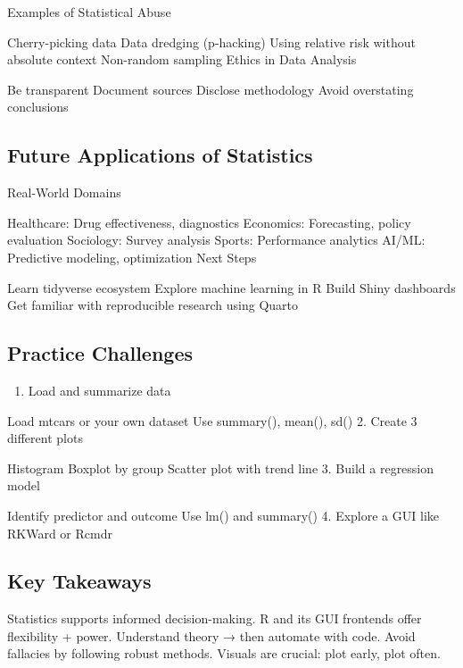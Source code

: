 \documentclass[
  letterpaper,
  DIV=11,
  numbers=noendperiod]{scrreprt}
\providecommand{\tightlist}{%
  \setlength{\itemsep}{0pt}\setlength{\parskip}{0pt}}
\begin{document}
Examples of Statistical Abuse

Cherry-picking data Data dredging (p-hacking) Using relative risk
without absolute context Non-random sampling Ethics in Data Analysis

Be transparent Document sources Disclose methodology Avoid overstating
conclusions

\subsection{Future Applications of
Statistics}\label{future-applications-of-statistics}

Real-World Domains

Healthcare: Drug effectiveness, diagnostics Economics: Forecasting,
policy evaluation Sociology: Survey analysis Sports: Performance
analytics AI/ML: Predictive modeling, optimization Next Steps

Learn tidyverse ecosystem Explore machine learning in R Build Shiny
dashboards Get familiar with reproducible research using Quarto

\subsection{Practice Challenges}\label{practice-challenges}

\begin{enumerate}
\def\labelenumi{\arabic{enumi}.}
\tightlist
\item
  Load and summarize data
\end{enumerate}

Load mtcars or your own dataset Use summary(), mean(), sd() 2. Create 3
different plots

Histogram Boxplot by group Scatter plot with trend line 3. Build a
regression model

Identify predictor and outcome Use lm() and summary() 4. Explore a GUI
like RKWard or Rcmdr

\subsection{Key Takeaways}\label{key-takeaways}

Statistics supports informed decision-making. R and its GUI frontends
offer flexibility + power. Understand theory → then automate with code.
Avoid fallacies by following robust methods. Visuals are crucial: plot
early, plot often.

\end{document}
